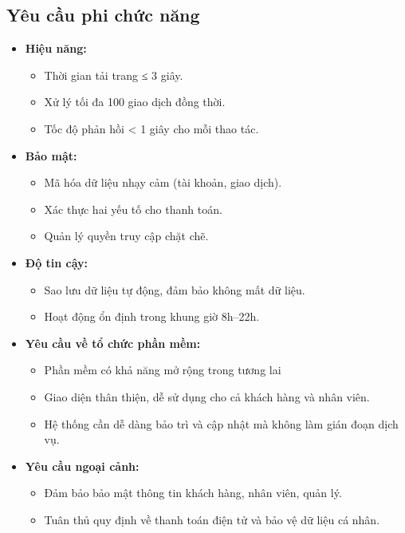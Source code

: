 \documentclass[a4paper]{article}
\begin{document}
\subsection{Yêu cầu phi chức năng}
\begin{itemize}
\item \textbf{Hiệu năng:}
  \begin{itemize}
    \item Thời gian tải trang ≤ 3 giây.
    \item Xử lý tối đa 100 giao dịch đồng thời.
    \item Tốc độ phản hồi < 1 giây cho mỗi thao tác.
  \end{itemize}
  
\item \textbf{Bảo mật:}
  \begin{itemize}
    \item Mã hóa dữ liệu nhạy cảm (tài khoản, giao dịch).
    \item Xác thực hai yếu tố cho thanh toán.
    \item Quản lý quyền truy cập chặt chẽ.
  \end{itemize}
  
\item \textbf{Độ tin cậy:}
  \begin{itemize}
    \item Sao lưu dữ liệu tự động, đảm bảo không mất dữ liệu.
    \item Hoạt động ổn định trong khung giờ 8h–22h.
  \end{itemize}
  
\item \textbf{Yêu cầu về tổ chức phần mềm:}
  \begin{itemize}
    \item Phần mềm có khả năng mở rộng trong tương lai
    \item Giao diện thân thiện, dễ sử dụng cho cả khách hàng và nhân viên.
    \item Hệ thống cần dễ dàng bảo trì và cập nhật mà không làm gián đoạn dịch vụ.
  \end{itemize}
  
\item \textbf{Yêu cầu ngoại cảnh:}
  \begin{itemize}
    \item Đảm bảo bảo mật thông tin khách hàng, nhân viên, quản lý.
    \item Tuân thủ quy định về thanh toán điện tử và bảo vệ dữ liệu cá nhân.
  \end{itemize}
\end{itemize}
\end{document}
